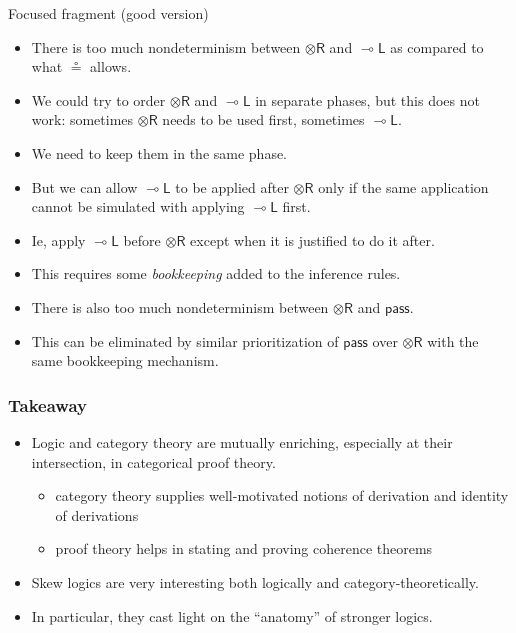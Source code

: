 \documentclass[10pt,t]{beamer}
\newcommand{\ot}{\otimes}
\newcommand{\uf}{\mathsf{pass}}
\newcommand{\otR}{\ot\mathsf{R}}
\newcommand{\loL}{{\lo}\mathsf{L}}
\newcommand{\lo}{\multimap}
\begin{document}
\begin{frame}{Focused fragment (good version)}

\begin{itemize}

\item There is too much nondeterminism between $\otR$ and $\loL$ as
  compared to what $\circeq$ allows.

\bigskip

\item We could try to order $\otR$ and $\loL$ in separate phases,
  but this does not work: sometimes $\otR$ needs to be used first,
  sometimes $\loL$.

\bigskip

\item We need to keep them in the same phase.

\item But we can allow $\loL$ to be applied after $\otR$ only if the
  same application cannot be simulated with applying $\loL$ first.

\item Ie, apply $\loL$ before $\otR$ except when it is justified to do
  it after.

\item This requires some \emph{bookkeeping} added to the inference
  rules.

\bigskip 

\item There is also too much nondeterminism between $\otR$ and $\uf$.

\item This can be eliminated by similar prioritization of $\uf$ over
  $\otR$ with the same bookkeeping mechanism.

\end{itemize}


\end{frame}


\begin{frame}

\frametitle{Takeaway}

\begin{itemize}

\item Logic and category theory are mutually enriching, especially
  at their intersection, in categorical proof theory.

\begin{itemize}
\item category theory supplies well-motivated notions of derivation
  and identity of derivations
\item proof theory helps in stating and proving coherence theorems
\end{itemize}

\bigskip

\item Skew logics are very interesting both logically
  and category-theoretically. 

\item In particular, they cast light on the ``anatomy'' of stronger
  logics.

\end{itemize}

\end{frame}
\end{document}
